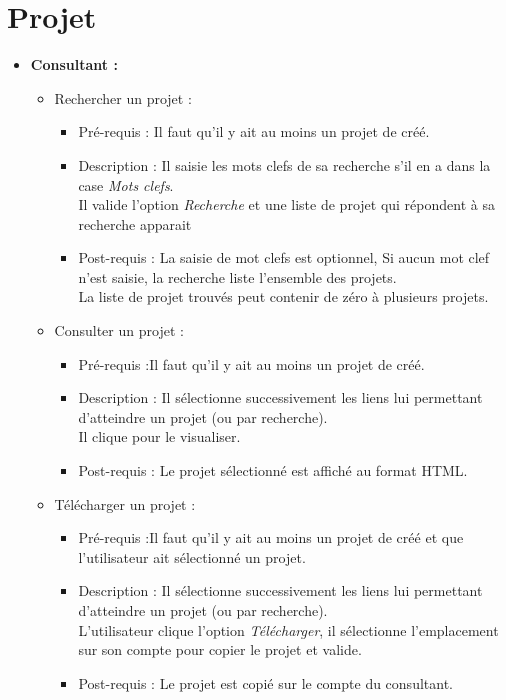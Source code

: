 \section{Projet}

	\begin{itemize}
	\item {\bf Consultant :}\\
		\begin{itemize}
		\item Rechercher un projet :
			\begin{itemize}
			\item Pr{\'e}-requis : Il faut qu'il y ait au moins un projet de cr{\'e}{\'e}.
			\item Description : Il saisie les mots clefs de sa recherche s'il en a dans la case {\it Mots clefs}.\\
			Il valide l'option {\it Recherche} et une liste de projet qui r{\'e}pondent {\`a} sa recherche apparait
			\item Post-requis : La saisie de mot clefs est optionnel, Si aucun mot clef n'est saisie, la recherche liste l'ensemble des projets.\\
			La liste de projet trouv{\'e}s peut contenir de z{\'e}ro {\`a} plusieurs projets.\\
			\end{itemize}

		\item Consulter un projet :
			\begin{itemize}
			\item Pr{\'e}-requis :Il faut qu'il y ait au moins un projet de cr{\'e}{\'e}.
			\item Description : Il s{\'e}lectionne successivement les liens lui permettant d'atteindre un projet (ou par recherche).\\
			Il clique pour le visualiser.
			\item Post-requis : Le projet s{\'e}lectionn{\'e} est affich{\'e} au format HTML.\\
			\end{itemize}
			
		\item T{\'e}l{\'e}charger un projet :
			\begin{itemize}
			\item Pr{\'e}-requis :Il faut qu'il y ait au moins un projet de cr{\'e}{\'e} et que l'utilisateur ait s{\'e}lectionn{\'e} un projet.
			\item Description : Il s{\'e}lectionne successivement les liens lui permettant d'atteindre un projet (ou par recherche).\\
			L'utilisateur clique l'option {\it T{\'e}l{\'e}charger}, il s{\'e}lectionne l'emplacement sur son compte pour copier le projet et valide.
			\item Post-requis : Le projet est copi{\'e} sur le compte du consultant.\\
			\end{itemize}
		\end{itemize}
	\end{itemize}

